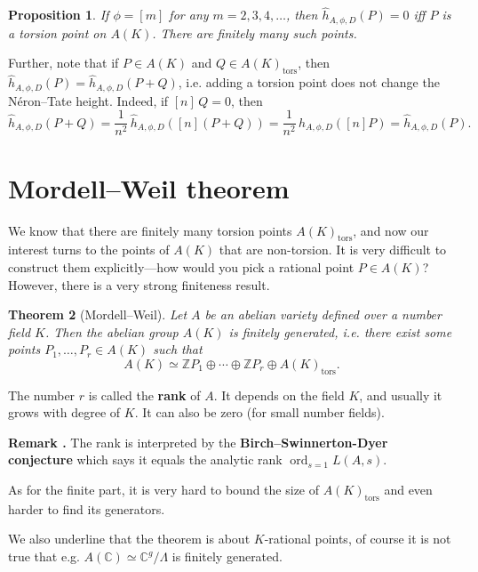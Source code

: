 \documentclass{article}
\newtheorem{proposition}{Proposition}[section]
\newtheorem{theorem}[proposition]{Theorem}
\theoremstyle{definition}
\DeclareMathOperator{\ord}{ord}
\newcommand{\isom}{\simeq}
\newcommand{\term}{\textbf}
\newcommand{\ZZ}{\mathbb{Z}}
\newcommand{\CC}{\mathbb{C}}
\newenvironment{remark}
{ \begin{shaded}\begingroup\small\noindent\refstepcounter{proposition}\textbf{Remark \theproposition.} }
{ \endgroup\end{shaded} }
\begin{document}
\begin{proposition}
  If $\phi = [m]$ for any $m = 2,3,4,\ldots$, then
  $\widehat{h}_{A,\phi,D} (P) = 0$ iff $P$ is a torsion point on $A (K)$. There
  are finitely many such points.
\end{proposition}

Further, note that if $P \in A (K)$ and $Q \in A (K)_\mathrm{tors}$, then
$\widehat{h}_{A,\phi,D} (P) = \widehat{h}_{A,\phi,D} (P+Q)$, i.e. adding a
torsion point does not change the N\'eron--Tate height. Indeed, if $[n]\,Q = 0$,
then
\[ \widehat{h}_{A,\phi,D} (P+Q) =
  \frac{1}{n^2}\,\widehat{h}_{A,\phi,D} ([n] (P+Q)) =
  \frac{1}{n^2}\,\widehat{h}_{A,\phi,D} ([n] P) =
  \widehat{h}_{A,\phi,D} (P). \]

\section{Mordell--Weil theorem}

We know that there are finitely many torsion points $A (K)_\mathrm{tors}$, and
now our interest turns to the points of $A (K)$ that are non-torsion. It is very
difficult to construct them explicitly---how would you pick a rational point
$P \in A (K)$? However, there is a very strong finiteness result.

\begin{theorem}[Mordell--Weil]
  Let $A$ be an abelian variety defined over a number field $K$. Then the
  abelian group $A (K)$ is finitely generated, i.e. there exist some points
  $P_1, \ldots, P_r \in A (K)$ such that
  $$A (K) \isom \ZZ P_1 \oplus \cdots \oplus \ZZ P_r \oplus A (K)_\mathrm{tors}.$$
\end{theorem}

The number $r$ is called the \term{rank} of $A$. It depends on the field $K$,
and usually it grows with degree of $K$. It can also be zero (for small number
fields).

\begin{remark}
  The rank is interpreted by the \term{Birch--Swinnerton-Dyer conjecture} which
  says it equals the analytic rank $\ord_{s=1} L (A,s)$.

  As for the finite part, it is very hard to bound the size of
  $A (K)_\mathrm{tors}$ and even harder to find its generators.

  We also underline that the theorem is about $K$-rational points, of course it
  is not true that e.g. $A (\CC) \isom \CC^g/\Lambda$ is finitely generated.
\end{remark}
\end{document}
